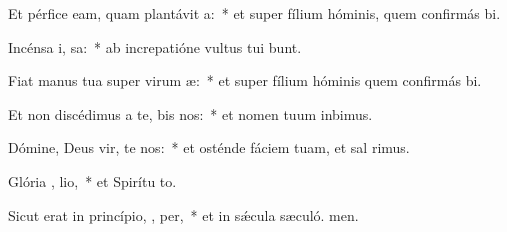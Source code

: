 \item Et pérfice eam, quam plantávit  a:~* et super fílium hóminis, quem confirmás bi.
\item Incénsa i,  sa:~* ab increpatióne vultus tui bunt.
\item Fiat manus tua super virum  æ:~* et super fílium hóminis quem confirmás bi.
\item Et non discédimus a te, bis nos:~* et nomen tuum inbimus.
\item Dómine, Deus vir, te nos:~* et osténde fáciem tuam, et sal rimus.
\item Glória ,  lio,~* et Spirítu to.
\item Sicut erat in princípio,  ,  per,~* et in sǽcula sæculó. men.
